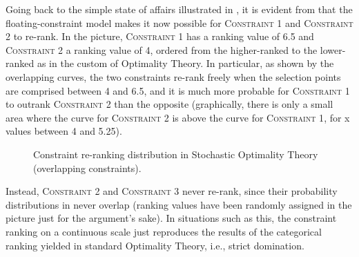 Going back to the simple state of affairs illustrated in , it is evident from  that the floating-constraint model makes it now possible for \textsc{Constraint 1} and \textsc{Constraint 2} to re-rank. In the picture, \textsc{Constraint 1} has a ranking value of 6.5 and \textsc{Constraint 2} a ranking value of 4, ordered from the higher-ranked to the lower-ranked as in the custom of Optimality Theory. In particular, as shown by the overlapping curves, the two constraints re-rank freely when the selection points are comprised between 4 and 6.5, and it is much more probable for \textsc{Constraint 1} to outrank \textsc{Constraint 2} than the opposite (graphically, there is only a small area where the curve for \textsc{Constraint 2} is above the curve for \textsc{Constraint 1}, for x values between 4 and 5.25).


\begin{figure}[htb]
\caption{Constraint re-ranking distribution in Stochastic Optimality Theory (overlapping constraints).}
\end{figure}

Instead, \textsc{Constraint 2} and \textsc{Constraint 3} never re-rank, since their probability distributions in  never overlap (ranking values have been randomly assigned in the picture just for the argument's sake). In situations such as this, the constraint ranking on a continuous scale just reproduces the results of the categorical ranking yielded in standard Optimality Theory, i.e., strict domination.

